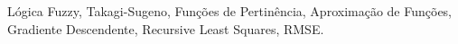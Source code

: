 Lógica Fuzzy, Takagi-Sugeno, Funções de Pertinência, Aproximação de Funções, Gradiente Descendente, Recursive Least Squares, RMSE.